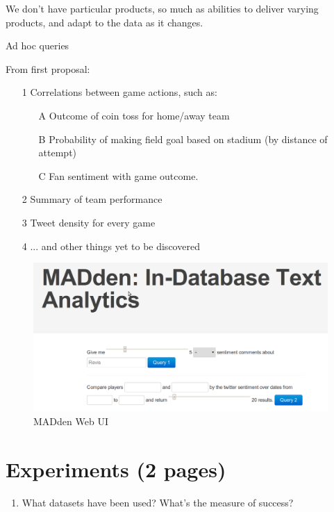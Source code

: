 \documentclass{article}
\newcommand{\system}{MADden\xspace}
\begin{document}
\begin{enumerate}
  We don't have particular products, so much as abilities to deliver varying products, and adapt to the data as it changes.

  Ad hoc queries

  From first proposal:
  \begin{enumerate}
  \item[1] Correlations between game actions, such as:
    \begin{enumerate}
    \item[A] Outcome of coin toss for home/away team
    \item[B] Probability of making field goal based on
      stadium (by distance of attempt)
    \item[C] Fan sentiment with game outcome.
    \end{enumerate}
  \item[2] Summary of team performance
  \item[3] Tweet density for every game
  \item[4] ... and other things yet to be discovered
  \end{enumerate}

  \begin{figure}
    \begin{center}
      \includegraphics[scale=0.3]{web-ui.png}
      \caption{{\system} Web UI}
      \label{fig:web-ui}
    \end{center}
  \end{figure}

  \section{Experiments (2 pages)}
  \begin{enumerate}
  \item What datasets have been used? What’s the measure of success?


\end{enumerate}
\end{enumerate}
\end{document}
